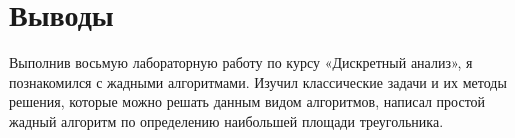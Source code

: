 \section{Выводы}

Выполнив восьмую лабораторную работу по курсу «Дискретный анализ», я познакомился с жадными алгоритмами. Изучил классические задачи и их методы решения, которые можно решать
данным видом алгоритмов, написал простой жадный алгоритм по определению наибольшей площади треугольника.

